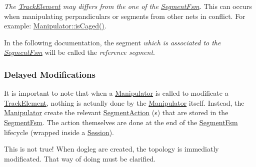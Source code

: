 {\itshape The \hyperlink{classKite_1_1TrackElement}{Track\-Element} may differs from the one of the \hyperlink{classKite_1_1SegmentFsm}{Segment\-Fsm}.} This can occurs when manipulating perpandiculars or segments from other nets in conflict. For example\-: \hyperlink{classKite_1_1Manipulator_af977361f4d90967fec7fbf1e778d01bb}{Manipulator\-::is\-Caged()}.

In the following documentation, the segment {\itshape which is associated to the \hyperlink{classKite_1_1SegmentFsm}{Segment\-Fsm}} will be called the {\itshape reference segment}.\hypertarget{classKite_1_1Manipulator_secManipDelayed}{}\subsubsection{Delayed Modifications}\label{classKite_1_1Manipulator_secManipDelayed}
It is important to note that when a \hyperlink{classKite_1_1Manipulator}{Manipulator} is called to modificate a \hyperlink{classKite_1_1TrackElement}{Track\-Element}, nothing is actually done by the \hyperlink{classKite_1_1Manipulator}{Manipulator} itself. Instead, the \hyperlink{classKite_1_1Manipulator}{Manipulator} create the relevant \hyperlink{classKite_1_1SegmentAction}{Segment\-Action} (s) that are stored in the \hyperlink{classKite_1_1SegmentFsm}{Segment\-Fsm}. The action themselves are done at the end of the \hyperlink{classKite_1_1SegmentFsm}{Segment\-Fsm} lifecycle (wrapped inside a \hyperlink{classKite_1_1Session}{Session}).

This is not true! When dogleg are created, the topology is immediatly modificated. That way of doing must be clarified. 

